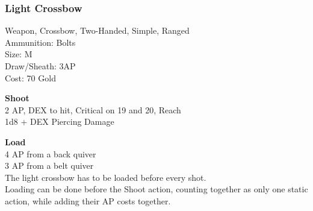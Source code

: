 \subsubsection{Light Crossbow}\label{weapon:lightCrossbow}
Weapon, Crossbow, Two-Handed, Simple, Ranged\\
Ammunition: Bolts\\
Size: M\\
Draw/Sheath: 3AP\\
Cost: 70 Gold

\textbf{Shoot} \\
2 AP, DEX to hit, Critical on 19 and 20,  Reach\\
1d8 + \texttimes DEX Piercing Damage

\textbf{Load} \\
4 AP from a back quiver\\
3 AP from a belt quiver\\
The light crossbow has to be loaded before every shot.\\
Loading can be done before the Shoot action, counting together as only one static action, while adding their AP costs together.\\